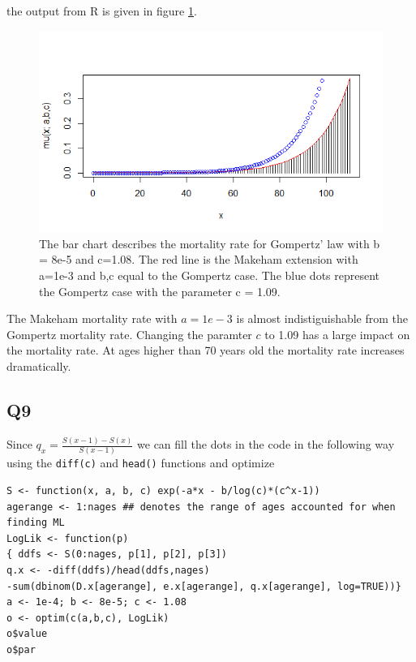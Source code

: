 \documentclass[11pt]{article}
\begin{document}
the output from R is given in figure \ref{Figure_Question8}.
\begin{center}
\begin{figure}

\includegraphics[scale=1]{Question_8_MakehamGompertz.png}

\caption{The bar chart describes the mortality rate for Gompertz' law with b = 8e-5 and c=1.08. The red line is the Makeham extension with a=1e-3 and b,c equal to the Gompertz case. The blue dots represent
the Gompertz case with the parameter c = 1.09.}
\label{Figure_Question8}

\end{figure}
\end{center}

The Makeham mortality rate with $a = 1e-3$ is almost indistiguishable from the Gompertz mortality rate. Changing the paramter $c$ to 1.09 has a large impact on the mortality rate. At ages higher than 70 years old the mortality rate increases dramatically.


\subsection*{Q9}

Since $q_x = \frac{S(x-1) - S(x)}{S(x-1)}$ we can fill the dots in the code in the following way using the \verb+diff(c)+ and \verb+head()+ functions and optimize

\begin{verbatim}
S <- function(x, a, b, c) exp(-a*x - b/log(c)*(c^x-1))
agerange <- 1:nages ## denotes the range of ages accounted for when finding ML
LogLik <- function(p)
{ ddfs <- S(0:nages, p[1], p[2], p[3])
q.x <- -diff(ddfs)/head(ddfs,nages)
-sum(dbinom(D.x[agerange], e.x[agerange], q.x[agerange], log=TRUE))}
a <- 1e-4; b <- 8e-5; c <- 1.08
o <- optim(c(a,b,c), LogLik) 
o$value
o$par
\end{verbatim}
\end{document}
